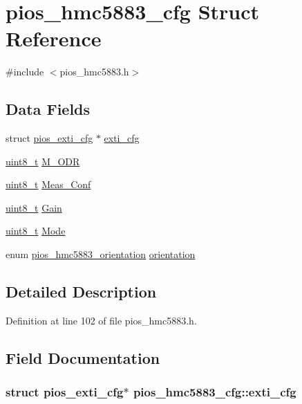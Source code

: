 \hypertarget{structpios__hmc5883__cfg}{\section{pios\-\_\-hmc5883\-\_\-cfg Struct Reference}
\label{structpios__hmc5883__cfg}
}


{\ttfamily \#include $<$pios\-\_\-hmc5883.\-h$>$}

\subsection*{Data Fields}
\begin{DoxyCompactItemize}
\item 
struct \hyperlink{structpios__exti__cfg}{pios\-\_\-exti\-\_\-cfg} $\ast$ \hyperlink{structpios__hmc5883__cfg_ac83cff150b246b7a8d768df5ab8e1407}{exti\-\_\-cfg}
\item 
\hyperlink{stdint_8h_aba7bc1797add20fe3efdf37ced1182c5}{uint8\-\_\-t} \hyperlink{structpios__hmc5883__cfg_a236d1b5f3c3858bc2edd263841c37ace}{M\-\_\-\-O\-D\-R}
\item 
\hyperlink{stdint_8h_aba7bc1797add20fe3efdf37ced1182c5}{uint8\-\_\-t} \hyperlink{structpios__hmc5883__cfg_ab04e80aeca39b18767e5e6cbe1f39654}{Meas\-\_\-\-Conf}
\item 
\hyperlink{stdint_8h_aba7bc1797add20fe3efdf37ced1182c5}{uint8\-\_\-t} \hyperlink{structpios__hmc5883__cfg_a82fb6708784acace10b4f5c5a9c8e23e}{Gain}
\item 
\hyperlink{stdint_8h_aba7bc1797add20fe3efdf37ced1182c5}{uint8\-\_\-t} \hyperlink{structpios__hmc5883__cfg_a0d50b5428ef5db686bdbd44127425f28}{Mode}
\item 
enum \hyperlink{group___p_i_o_s___h_m_c5883_ga9b5f48f8223effbfd7dbb15297957119}{pios\-\_\-hmc5883\-\_\-orientation} \hyperlink{structpios__hmc5883__cfg_ab8151b7d77ee14eb956089aa262c8de7}{orientation}
\end{DoxyCompactItemize}


\subsection{Detailed Description}


Definition at line 102 of file pios\-\_\-hmc5883.\-h.



\subsection{Field Documentation}
\hypertarget{structpios__hmc5883__cfg_ac83cff150b246b7a8d768df5ab8e1407}{
\subsubsection[{exti\-\_\-cfg}]{\setlength{\rightskip}{0pt plus 5cm}struct {\bf pios\-\_\-exti\-\_\-cfg}$\ast$ pios\-\_\-hmc5883\-\_\-cfg\-::exti\-\_\-cfg}}\label{structpios__hmc5883__cfg_ac83cff150b246b7a8d768df5ab8e1407}


